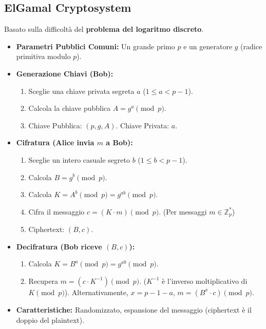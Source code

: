 \documentclass{article}
\begin{document}
\subsection{ElGamal Cryptosystem}
Basato sulla difficoltà del \textbf{problema del logaritmo discreto}.
\begin{itemize}
    \item \textbf{Parametri Pubblici Comuni:} Un grande primo $p$ e un generatore $g$ (radice primitiva modulo $p$).
    \item \textbf{Generazione Chiavi (Bob):}
    \begin{enumerate}[label=\alph*)]
        \item Sceglie una chiave privata segreta $a$ ($1 \le a < p-1$).
        \item Calcola la chiave pubblica $A = g^a \pmod{p}$.
        \item Chiave Pubblica: $(p, g, A)$. Chiave Privata: $a$.
    \end{enumerate}
    \item \textbf{Cifratura (Alice invia $m$ a Bob):}
    \begin{enumerate}[label=\alph*)]
        \item Sceglie un intero casuale segreto $b$ ($1 \le b < p-1$).
        \item Calcola $B = g^b \pmod{p}$.
        \item Calcola $K = A^b \pmod{p} = g^{ab} \pmod{p}$.
        \item Cifra il messaggio $c = (K \cdot m) \pmod{p}$. (Per messaggi $m \in \mathbb{Z}_p^*$)
        \item Ciphertext: $(B, c)$.
    \end{enumerate}
    \item \textbf{Decifratura (Bob riceve $(B, c)$):}
    \begin{enumerate}[label=\alph*)]
        \item Calcola $K = B^a \pmod{p} = g^{ab} \pmod{p}$.
        \item Recupera $m = (c \cdot K^{-1}) \pmod{p}$. ($K^{-1}$ è l'inverso moltiplicativo di $K \pmod p$).
        Alternativamente, $x = p-1-a$, $m = (B^x \cdot c) \pmod p$.
    \end{enumerate}
    \item \textbf{Caratteristiche:} Randomizzato, espansione del messaggio (ciphertext è il doppio del plaintext).
\end{itemize}
\end{document}
